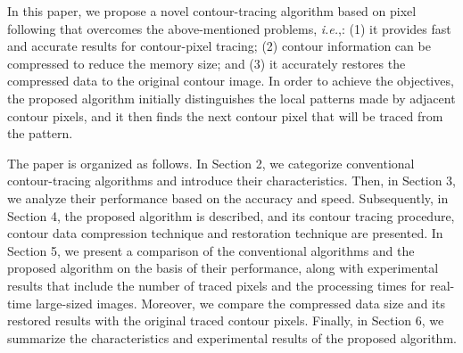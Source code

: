 \documentclass[sensors,article,accept,moreauthors,pdftex,10pt,a4paper]{mdpi}
\begin{document}

In this paper, we propose a novel contour-tracing algorithm based on pixel following that overcomes the above-mentioned problems, \emph{i.e.},: (1) it provides fast and accurate results for contour-pixel tracing; (2) contour information can be compressed to reduce the memory size; and (3) it accurately restores the compressed data to the original contour image. In order to achieve the objectives, the proposed algorithm initially distinguishes the local patterns made by adjacent contour pixels, and it then finds the next contour pixel that will be traced from the pattern. 


The paper is organized as follows. In Section 2, we categorize conventional contour-tracing algorithms and introduce their characteristics. Then, in Section 3, we analyze their performance based on the accuracy and speed. Subsequently, in Section 4, the proposed algorithm is described, and its contour tracing procedure, contour data compression technique and restoration technique are presented. In Section 5, we present a comparison of the conventional algorithms and the proposed algorithm on the basis of their performance, along with experimental results that include the number of traced pixels and the processing times for real-time large-sized images. Moreover, we compare the compressed data size and its restored results with the original traced contour pixels. Finally, in \linebreak Section 6, we summarize the characteristics and experimental results of the proposed algorithm.
\end{document}
